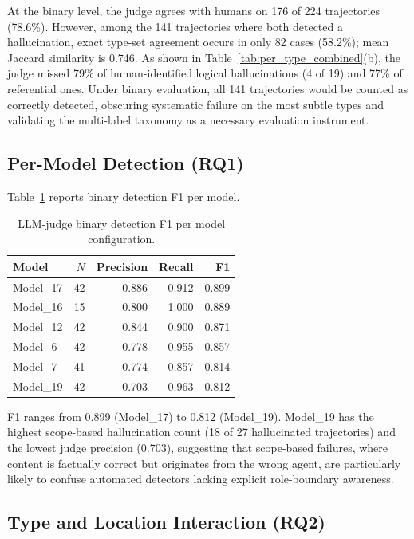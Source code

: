 \documentclass{article}
\begin{document}
At the binary level, the judge agrees with humans on 176 of 224 trajectories (78.6\%). However, among the 141 trajectories where both detected a hallucination, exact type-set agreement occurs in only 82 cases (58.2\%); mean Jaccard similarity is 0.746. As shown in Table~\ref{tab:per_type_combined}(b), the judge missed 79\% of human-identified logical hallucinations (4 of 19) and 77\% of referential ones. Under binary evaluation, all 141 trajectories would be counted as correctly detected, obscuring systematic failure on the most subtle types and validating the multi-label taxonomy as a necessary evaluation instrument.

\subsection{Per-Model Detection (RQ1)}
\label{sec:per_model_detection}

Table~\ref{tab:per_model_f1} reports binary detection F1 per model.

\begin{table}[t]
\caption{LLM-judge binary detection F1 per model configuration.}
\label{tab:per_model_f1}
\centering
\small
\begin{tabular}{lrrrr}
\toprule
\textbf{Model} & $N$ & \textbf{Precision} & \textbf{Recall} & \textbf{F1} \\
\midrule
Model\_17 & 42 & 0.886 & 0.912 & 0.899 \\
Model\_16 & 15 & 0.800 & 1.000 & 0.889 \\
Model\_12 & 42 & 0.844 & 0.900 & 0.871 \\
Model\_6  & 42 & 0.778 & 0.955 & 0.857 \\
Model\_7  & 41 & 0.774 & 0.857 & 0.814 \\
Model\_19 & 42 & 0.703 & 0.963 & 0.812 \\
\bottomrule
\end{tabular}
\end{table}

F1 ranges from 0.899 (Model\_17) to 0.812 (Model\_19). Model\_19 has the highest scope-based hallucination count (18 of 27 hallucinated trajectories) and the lowest judge precision (0.703), suggesting that scope-based failures, where content is factually correct but originates from the wrong agent, are particularly likely to confuse automated detectors lacking explicit role-boundary awareness.

\subsection{Type and Location Interaction (RQ2)}
\label{sec:type_location}
\end{document}
